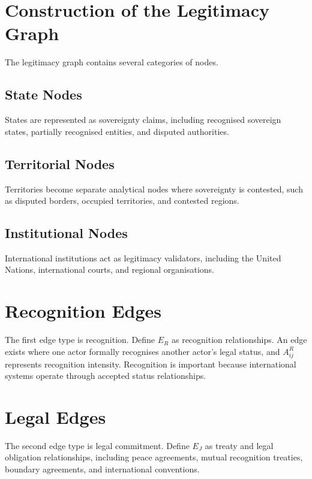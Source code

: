 \documentclass[11pt,openany]{book}
\theoremstyle{plain}
\theoremstyle{definition}
\begin{document}
\section*{Construction of the Legitimacy Graph}

The legitimacy graph contains several categories of nodes.

\subsection*{State Nodes}

States are represented as sovereignty claims, including recognised sovereign states, partially recognised entities, and disputed authorities.

\subsection*{Territorial Nodes}

Territories become separate analytical nodes where sovereignty is contested, such as disputed borders, occupied territories, and contested regions.

\subsection*{Institutional Nodes}

International institutions act as legitimacy validators, including the United Nations, international courts, and regional organisations.

\section*{Recognition Edges}

The first edge type is recognition. Define \(E_R\) as recognition relationships. An edge exists where one actor formally recognises another actor's legal status, and \(A^R_{ij}\) represents recognition intensity. Recognition is important because international systems operate through accepted status relationships.

\section*{Legal Edges}

The second edge type is legal commitment. Define \(E_J\) as treaty and legal obligation relationships, including peace agreements, mutual recognition treaties, boundary agreements, and international conventions. 
\end{document}
